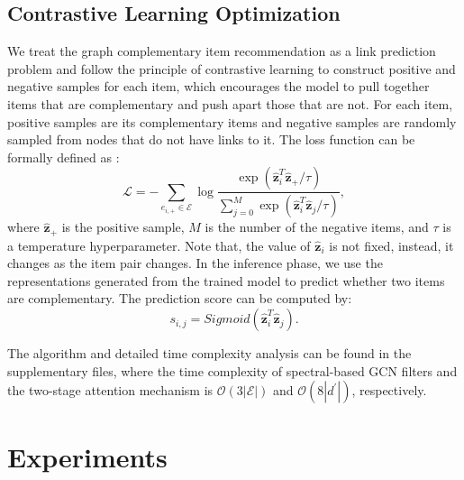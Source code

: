 \documentclass[letterpaper]{article} %
\newcommand{\suhang}[1]{\textcolor{blue}{SW: #1}}
\begin{document}
 \subsection{Contrastive Learning Optimization} \label{sec:loss}
 We treat the graph complementary item recommendation as a link prediction problem and follow the principle of contrastive learning \cite{he2020momentum} to construct positive and negative samples for each item, which encourages the model to pull together items that are complementary and push apart those that are not. For each item, positive samples are its complementary items and negative samples are randomly sampled from nodes that do not have links to it. The loss function can be formally defined as :
 \begin{equation}
    \mathcal{L} = -\sum_{e_{i,+}\in\mathcal{E}}\log{\frac{\exp(\mathbf{\hat{z}}_i^T\mathbf{\hat{z}}_+/\tau)}{\sum_{j=0}^{M}\exp(\mathbf{\hat{z}}_i^T\mathbf{\hat{z}}_{j}/\tau)}},
    \label{eq:loss}
 \end{equation}
where $\mathbf{\hat{z}}_+$ is the positive sample, $M$ is the number of the negative items, and $\tau$ is a temperature hyperparameter. Note that, the value of $\mathbf{\hat{z}}_i$ is not fixed, instead, it changes as the item pair changes. In the inference phase, we use the representations generated from the trained model to predict whether two items are complementary. The prediction score can be computed by:
 \begin{equation}
     s_{i,j}=Sigmoid(\mathbf{\hat{z}}_i^T\mathbf{\hat{z}}_j).
     \label{eq:infer}
 \end{equation}

The algorithm and detailed time complexity analysis can be found in the supplementary files, where the time complexity of spectral-based GCN filters and the two-stage attention mechanism is $\mathcal{O}(3|\mathcal{E}|)$ and $\mathcal{O}(8|d^{\prime}|)$, respectively.

 \section{Experiments}
\end{document}
